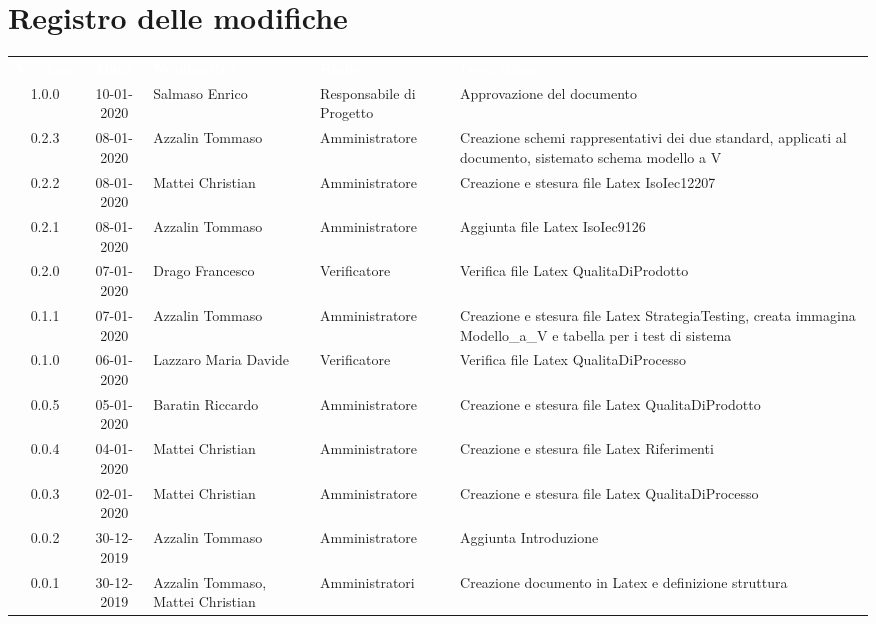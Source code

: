 \section*{Registro delle modifiche}
{
\renewcommand{\arraystretch}{1.5}
\centering
\begin{longtable}{ c c  C{4cm}  C{3cm} C{4cm}}
\textcolor{white}{\textbf{Versione}} & \textcolor{white}{\textbf{Data}} & \textcolor{white}{\textbf{Nominativo}} & \textcolor{white}{\textbf{Ruolo}} & \textcolor{white}{\textbf{Descrizione}}\\	

1.0.0 & 10-01-2020 & Salmaso Enrico & Responsabile di Progetto & Approvazione del documento \\	

0.2.3 & 08-01-2020 & Azzalin Tommaso & Amministratore & Creazione schemi rappresentativi dei due standard, applicati al documento, sistemato schema modello a V \\
0.2.2 & 08-01-2020 & Mattei Christian & Amministratore & Creazione e stesura file Latex IsoIec12207 \\
0.2.1 & 08-01-2020 & Azzalin Tommaso & Amministratore & Aggiunta file Latex IsoIec9126 \\
0.2.0 & 07-01-2020 & Drago Francesco & Verificatore & Verifica file Latex QualitaDiProdotto \\
0.1.1 & 07-01-2020 & Azzalin Tommaso & Amministratore & Creazione e stesura file Latex StrategiaTesting, creata immagina Modello\_a\_V e tabella per i test di sistema \\
0.1.0 & 06-01-2020 & Lazzaro Maria Davide & Verificatore & Verifica file Latex QualitaDiProcesso \\
0.0.5 & 05-01-2020 & Baratin Riccardo & Amministratore & Creazione e stesura file Latex QualitaDiProdotto \\
0.0.4 & 04-01-2020 & Mattei Christian & Amministratore & Creazione e stesura file Latex Riferimenti \\
0.0.3 & 02-01-2020 & Mattei Christian & Amministratore & Creazione e stesura file Latex QualitaDiProcesso \\
0.0.2 & 30-12-2019 & Azzalin Tommaso & Amministratore & Aggiunta Introduzione \\
0.0.1 & 30-12-2019 & Azzalin Tommaso, Mattei Christian & Amministratori & Creazione documento in Latex e definizione struttura \\	
		
\end{longtable}
}
